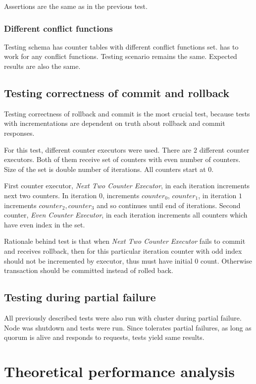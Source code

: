 Assertions are the same as in the previous test.

\subsubsection{Different conflict functions}
Testing schema has counter tables with different conflict functions set. \mpp has to work for any conflict functions. Testing scenario remains the same. Expected results are also the same.

\subsection{Testing correctness of commit and rollback}
Testing correctness of rollback and commit is the most crucial test, because tests with incrementations are dependent on truth about rollback and commit responses.

For this test, different counter executors were used. There are $2$ different counter executors. Both of them receive set of counters with even number of counters. Size of the set is double number of iterations. All counters start at $0$.

First counter executor, \emph{Next Two Counter Executor}, in each iteration increments next two counters. In iteration $0$, increments $counter_{0}$, $counter_{1}$, in iteration $1$ increments $counter_{2}, counter_{3}$ and so continues until end of iterations. Second counter, \emph{Even Counter Executor}, in each iteration increments all counters which have even index in the set.

Rationale behind test is that when \emph{Next Two Counter Executor} fails to commit and receives rollback, then for this particular iteration counter with odd index should not be incremented by executor, thus must have initial $0$ count. Otherwise transaction should be committed instead of rolled back.

\subsection{Testing during partial failure}
All previously described tests were also run with cluster during partial failure. Node was shutdown and tests were run. Since \mpp tolerates partial failures, as long as quorum is alive and responds to requests, tests yield same results.

\section{Theoretical performance analysis}

